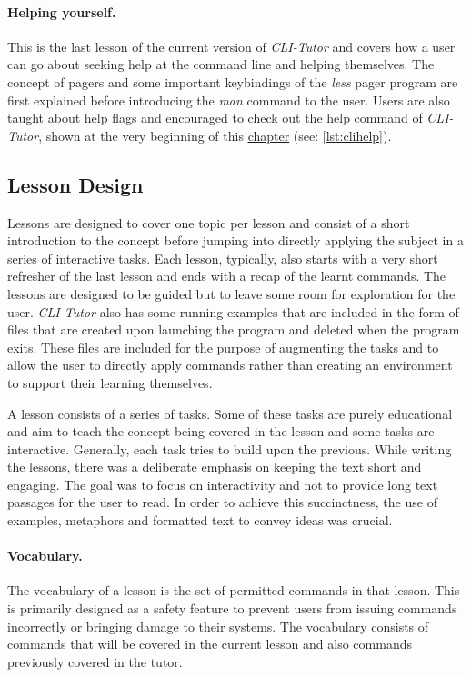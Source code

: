\paragraph{Helping yourself.} This is the last lesson of the current version of
\textit{CLI-Tutor} and covers how a user can go about seeking help at the
command line and helping themselves. The concept of pagers and some important
keybindings of the \textit{less} pager program are first explained before
introducing the \textit{man} command to the user. Users are also taught about
help flags and encouraged to check out the help command of \textit{CLI-Tutor},
shown at the very beginning of this \hyperref[chap:clitutor]{chapter} (see:
\autoref{lst:clihelp}).

\subsection{Lesson Design} 
Lessons are designed to cover one topic per lesson and consist of a short
introduction to the concept before jumping into directly applying the subject
in a series of interactive tasks. Each lesson, typically, also starts with a
very short refresher of the last lesson and ends with a recap of the learnt
commands. The lessons are designed to be guided but to leave some room for
exploration for the user. \textit{CLI-Tutor} also has some running examples
that are included in the form of files that are created upon launching the
program and deleted when the program exits. These files are included  for the
purpose of augmenting the tasks and to allow the user to directly apply
commands rather than creating an environment to support their learning
themselves.

A lesson consists of a series of tasks. Some of these tasks are purely
educational and aim to teach the concept being covered in the lesson and some
tasks are interactive. Generally, each task tries to build upon the previous.
While writing the lessons, there was a deliberate emphasis on keeping the text
short and engaging. The goal was to focus on interactivity and not to
provide long text passages for the user to read. In order to achieve this
succinctness, the use of examples, metaphors and formatted text to convey ideas
was crucial.\\


\paragraph{Vocabulary.}  The vocabulary of a lesson is the set of permitted
commands in that lesson. This is primarily designed as a safety feature to
prevent users from issuing commands incorrectly or bringing damage to their
systems. The vocabulary consists of commands that will be covered in the
current lesson and also commands previously covered in the tutor.

